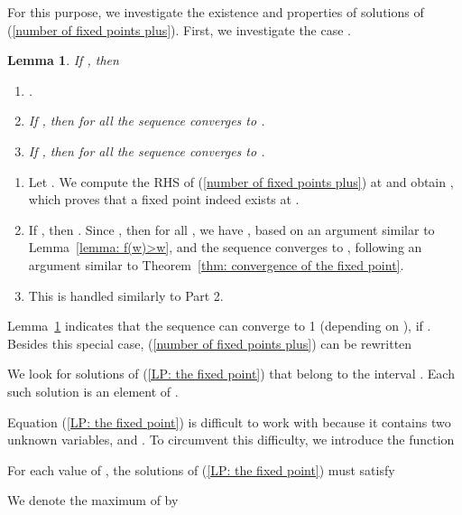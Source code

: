 \documentclass{IEEEtran}
\newtheorem{lemma}{Lemma}
\begin{document}
For this purpose, we investigate the existence and properties of solutions of (\ref{number of fixed points plus}).
First, we investigate the case .
\begin{lemma} \label{lemma:overload fixed point is stable}
If , then
\begin{enumerate}
\item .
\item If , then for all  the sequence  converges to .
\item If , then for all  the sequence  converges to .
\end{enumerate}
\end{lemma}
\begin{IEEEproof}
\leavevmode
\begin{enumerate}
\item Let . We compute the RHS of (\ref{number of fixed points
plus}) at  and obtain  , which proves that a fixed point indeed exists at .

\item If , then . Since , then for all  , we have , based on an argument
    similar to Lemma~\ref{lemma: f(w)>w}, and the sequence  converges to , following an argument similar to
    Theorem~\ref{thm: convergence of the fixed point}.

\item This is handled similarly to Part 2.
\end{enumerate}
\end{IEEEproof}

Lemma~\ref{lemma:overload fixed point is stable} indicates that the sequence  can converge to 1 (depending on ), if . Besides this special case, (\ref{number of fixed points plus}) can be rewritten

We look for solutions of (\ref{LP: the fixed point}) that belong to the interval . Each such solution is an element of .


Equation (\ref{LP: the fixed point}) is difficult to work with because it contains two unknown variables,  and . To circumvent this
difficulty, we introduce the function

For each value of , the solutions of (\ref{LP: the fixed point}) must satisfy

We denote the maximum of 
by
 
\end{document}
